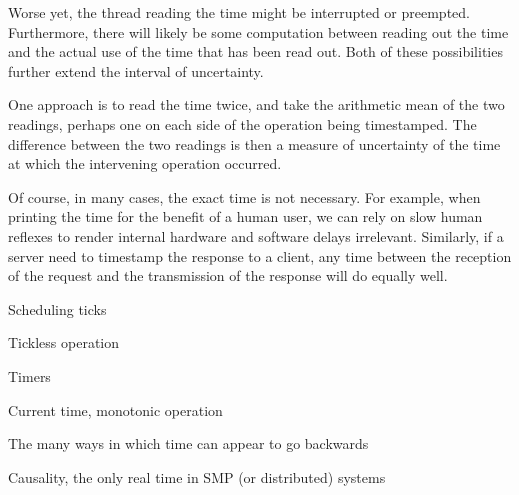 Worse yet, the thread reading the time might be interrupted or preempted.
Furthermore, there will likely be some computation between reading out
the time and the actual use of the time that has been read out.
Both of these possibilities further extend the interval of uncertainty.

One approach is to read the time twice, and take the arithmetic mean
of the two readings, perhaps one on each side of the operation being
timestamped.
The difference between the two readings is then a measure of uncertainty
of the time at which the intervening operation occurred.

Of course, in many cases, the exact time is not necessary.
For example, when printing the time for the benefit of a human user,
we can rely on slow human reflexes to render internal hardware and
software delays irrelevant.
Similarly, if a server need to timestamp the response to a client, any
time between the reception of the request and the transmission of the
response will do equally well.

Scheduling ticks

Tickless operation

Timers

Current time, monotonic operation

The many ways in which time can appear to go backwards

Causality, the only real time in SMP (or distributed) systems
